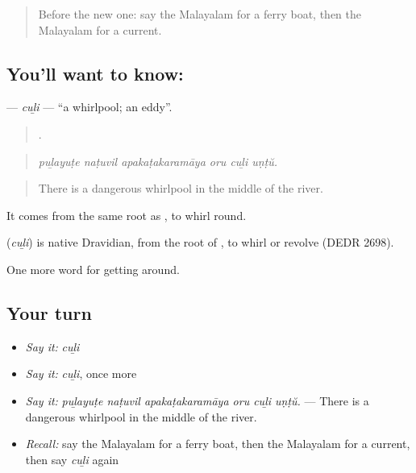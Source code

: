 \label{lesson:ML-C476-culi}



\begin{quote}
Before the new one: say the Malayalam for a ferry boat, then the Malayalam for a current.
\end{quote}

\subsection*{You'll want to know: }
\textbf{} — \emph{cuḻi} — \textquotedblleft{}a whirlpool; an eddy\textquotedblright{}.

\begin{quote}
     .
\end{quote}

\begin{quote}
\emph{puḻayuṭe naṭuvil apakaṭakaramāya oru cuḻi uṇṭŭ.}
\end{quote}

\begin{quote}
There is a dangerous whirlpool in the middle of the river.
\end{quote}

It comes from the same root as , to whirl round.

\begin{cousinweb}
\textbf{} (\emph{cuḻi}) is native Dravidian, from the root of , to whirl or revolve (DEDR 2698).
\end{cousinweb}

\begin{grammarlens}[title={What you've built}]
One more word for getting around.
\end{grammarlens}

\subsection*{Your turn}
\begin{itemize}
\raggedright
  \item \emph{Say it:} \emph{cuḻi}
  \item \emph{Say it:} \emph{cuḻi}, once more
  \item \emph{Say it:} \emph{puḻayuṭe naṭuvil apakaṭakaramāya oru cuḻi uṇṭŭ.} — There is a dangerous whirlpool in the middle of the river.
  \item \emph{Recall:} say the Malayalam for a ferry boat, then the Malayalam for a current, then say \emph{cuḻi} again
\end{itemize}

